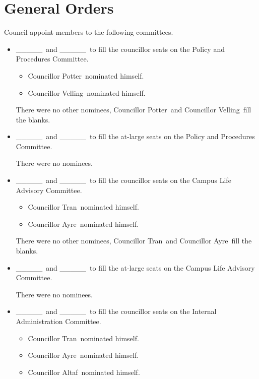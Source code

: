 \documentclass[12pt, letterpaper]{article}
\newcommand{\blank}{\_\_\_\_\_\ }
\newcommand{\tomson}{Councillor Tran}
\newcommand{\tristan}{Councillor Potter}
\newcommand{\subham}{Councillor Altaf}
\newcommand{\alexander}{Councillor Ayre}
\newcommand{\seneca}{Councillor Velling}
\begin{document}
\section*{General Orders}
\begin{motion}
    \birt Council appoint members to the following committees. \begin{itemize}

        \item \blank and \blank to fill the councillor seats on the Policy and 
            Procedures Committee.
            \begin{itemize}
                \item \tristan\ nominated himself.
                \item \seneca\ nominated himself.
            \end{itemize}

            There were no other nominees, \tristan\ and \seneca\ fill the 
            blanks.

        \item \blank and \blank to fill the at-large seats on the Policy and 
            Procedures Committee.

            There were no nominees. 

        \item \blank and \blank to fill the councillor seats on the Campus 
            Life Advisory Committee. 
            \begin{itemize}
                \item \tomson\ nominated himself.
                \item \alexander\ nominated himself.
            \end{itemize}

            There were no other nominees, \tomson\ and \alexander\ fill the
            blanks. 

        \item \blank and \blank to fill the at-large seats on the Campus 
            Life Advisory Committee. 

            There were no nominees. 

        \item \blank and \blank to fill the councillor seats on the Internal
            Administration Committee.
            \begin{itemize}
                \item \tomson\ nominated himself.
                \item \alexander\ nominated himself.
                \item \subham\ nominated himself. 
            \end{itemize}


\end{itemize}
\end{motion}
\end{document}
